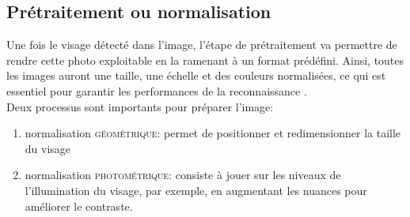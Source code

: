 \subsection{Prétraitement ou normalisation}
Une fois le visage détecté dans l'image, l'étape de prétraitement va permettre de rendre cette photo exploitable en la ramenant à un format prédéfini. Ainsi, toutes les images auront une taille, une échelle et des couleurs normalisées, ce qui est essentiel pour garantir les performances de la reconnaissance \cite{Xthesis_1}.
\\
Deux processus sont importants pour préparer l'image:
\begin{enumerate}
\item normalisation \textsc{géométrique}: permet de positionner et redimensionner la taille du visage
\item normalisation \textsc{photométrique}: consiste à jouer sur les niveaux de l'illumination du visage, par exemple, en augmentant les nuances pour améliorer le contraste.
\end{enumerate}


